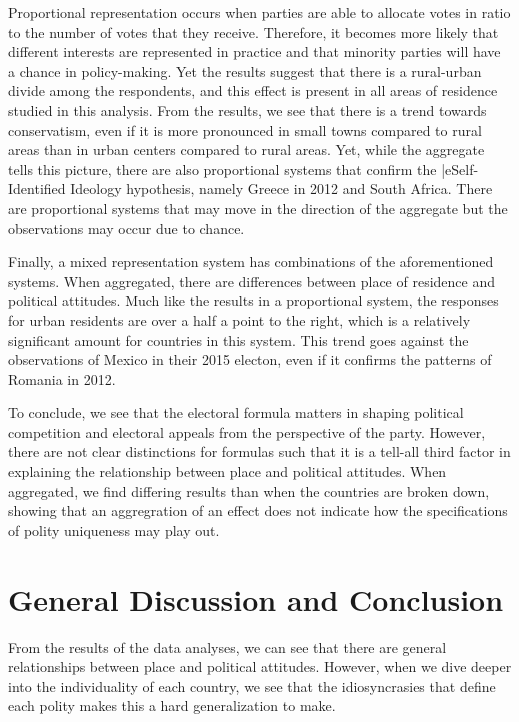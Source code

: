 \documentclass[12pt, titlepage]{article}
\begin{document}
Proportional representation occurs when parties are able to allocate votes in ratio to the number of votes that they receive. Therefore, it becomes more likely that different interests are represented in practice and that minority parties will have a chance in policy-making. Yet the results suggest that there is a rural-urban divide among the respondents, and this effect is present in all areas of residence studied in this analysis. From the results, we see that there is a trend towards conservatism, even if it is more pronounced in small towns compared to rural areas than in urban centers compared to rural areas. Yet, while the aggregate tells this picture, there are also proportional systems that confirm the |e{Self-Identified Ideology} hypothesis, namely Greece in 2012 and South Africa. There are proportional systems that may move in the direction of the aggregate but the observations may occur due to chance.

Finally, a mixed representation system has combinations of the aforementioned systems. When aggregated, there are differences between place of residence and political attitudes. Much like the results in a proportional system, the responses for urban residents are over a half a point to the right, which is a relatively significant amount for countries in this system. This trend goes against the observations of Mexico in their 2015 electon, even if it confirms the patterns of Romania in 2012. 

To conclude, we see that the electoral formula matters in shaping political competition and electoral appeals from the perspective of the party. However, there are not clear distinctions for formulas such that it is a tell-all third factor in explaining the relationship between place and political attitudes. When aggregated, we find differing results than when the countries are broken down, showing that an aggregration of an effect does not indicate how the specifications of polity uniqueness may play out.

\section{General Discussion and Conclusion}

From the results of the data analyses, we can see that there are general relationships between place and political attitudes. However, when we dive deeper into the individuality of each country, we see that the idiosyncrasies that define each polity makes this a hard generalization to make. 
\end{document}
